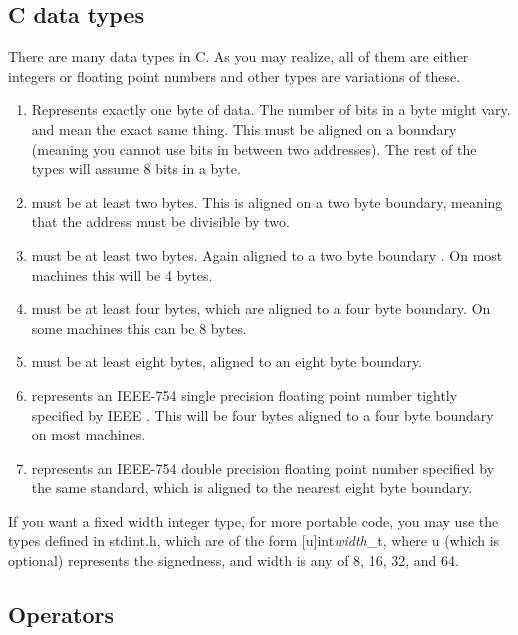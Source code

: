 \subsection{C data types}

There are many data types in C.
As you may realize, all of them are either integers or floating point numbers and other types are variations of these.

\begin{enumerate}
\item {} Represents exactly one byte of data.
  The number of bits in a byte might vary.
   and  mean the exact same thing.
  This must be aligned on a boundary (meaning you cannot use bits in between two addresses).
  The rest of the types will assume 8 bits in a byte.
\item {} must be at least two bytes.
  This is aligned on a two byte boundary, meaning that the address must be divisible by two.
\item {} must be at least two bytes.
  Again aligned to a two byte boundary \cite[P.
    34]{ISON1124}. On most machines this will be 4 bytes.
\item {} must be at least four bytes, which are aligned to a four byte boundary.
  On some machines this can be 8 bytes.
	\item {} must be at least eight bytes, aligned to an eight byte boundary.
	\item {} represents an IEEE-754 single precision floating point number tightly specified by IEEE \cite{4610935}.
    This will be four bytes aligned to a four byte boundary on most machines.
	\item {} represents an IEEE-754 double precision floating point number specified by the same standard, which is aligned to the nearest eight byte boundary.
\end{enumerate}

If you want a fixed width integer type, for more portable code, you may use the types defined in stdint.h, which are of the form [u]int\emph{width}\_t, where u (which is optional) represents the signedness, and width is any of 8, 16, 32, and 64.

\subsection{Operators}

